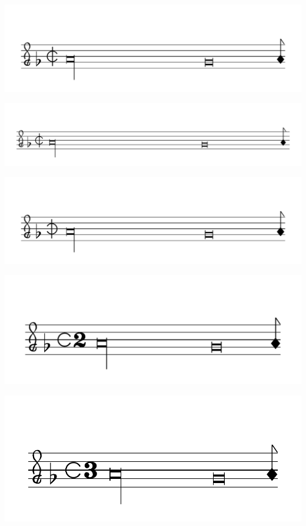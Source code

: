 \documentclass{article}
\begin{document}
        \includegraphics[scale=0.5]{figures_tests/pdf/smens/commonmeter5.pdf}

        \includegraphics[scale=0.5]{figures_tests/pdf/smens/commonmeter6.pdf}

        \includegraphics[scale=0.5]{figures_tests/pdf/smens/commonmeter8.pdf}

        \includegraphics[scale=0.5]{figures_tests/pdf/smens/commonmeter9.pdf}

        \includegraphics[scale=0.5]{figures_tests/pdf/smens/commonmeter10.pdf}
\end{document}
